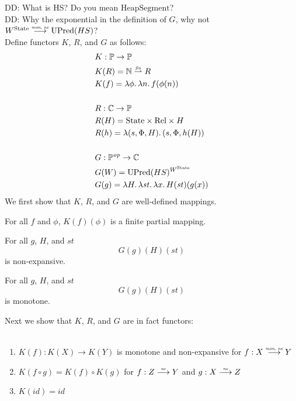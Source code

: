 \documentclass{article}
\newcommand{\forcenewline}{$\phantom{v}$\\}
\newcommand{\finparfun}{\stackrel{\textit{\tiny{fin}}}{\rightharpoonup}}
\newcommand{\monnefun}{\stackrel{\textit{\tiny{mon, ne}}}{\longrightarrow}}
\newcommand{\nefun}{\stackrel{\textit{\tiny{ne}}}{\longrightarrow}}
\newcommand{\id}{\var{id}}
\newcommand{\CatC}{\mathbb{C}}
\newcommand{\CatP}{\mathbb{P}}
\newcommand\dominique[1]{{\color{purple} \sf \footnotesize {DD: #1}}\\}
\newcommand{\var}[1]{\mathit{#1}}
\newcommand{\plaindom}[1]{\mathrm{#1}}
\newcommand{\HeapSegments}{\plaindom{HeapSegment}}
\newcommand{\nats}{\mathbb{N}}
\newcommand{\Rel}{\plaindom{Rel}}
\newcommand{\States}{\plaindom{State}}
\newcommand{\UPred}[1]{\plaindom{UPred}(#1)}
\begin{document}
\dominique{What is HS? Do you mean $\HeapSegments$?}
\dominique{Why the exponential in the definition of $G$, why not $W^{\States} \monnefun \UPred{HS}$?}
Define functors $K$, $R$, and $G$ as follows:
\begin{align*}
  & K : \CatP \rightarrow \CatP \\
  & K(R) = \nats \finparfun R \\
  & K(f) = \lambda \phi \ldotp \lambda n \ldotp f(\phi(n)) \\
  & \\
  & R : \CatC \rightarrow \CatP \\
  & R(H) = \States \times \Rel \times H\\
  & R(h) = \lambda (s,\Phi,H) \ldotp (s,\Phi,h(H))\\
  & \\
  & G : \CatP^{\var{op}} \rightarrow \CatC \\
  & G(W) = \UPred{HS}^{W^{\States}} \\
  & G(g) = \lambda H \ldotp \lambda \var{st} \ldotp \lambda x \ldotp H (\var{st})(g(x))
\end{align*}
We first show that $K$, $R$, and $G$ are well-defined mappings.
\begin{lemma}
  \label{lem:world-finpar}
  For all $f$ and $\phi$, $K(f)(\phi)$ is a finite partial mapping.
\end{lemma}
\begin{lemma}
\label{lem:HSP-mon}
For all $g$, $H$, and $\var{st}$
\[
G(g) (H) (\var{st})
\]
is non-expansive.
\end{lemma}
\begin{lemma}
\label{lem:HSP-ne}
For all $g$, $H$, and $\var{st}$
\[
G(g) (H) (\var{st})
\]
is monotone.
\end{lemma}
Next we show that $K$, $R$, and $G$ are in fact functors:
\begin{lemma}[$K$ functorial]\forcenewline
\label{lem:K-func}
  \begin{enumerate}
  \item $K(f) : K(X) \rightarrow K(Y)$ is monotone and non-expansive for $f : X \monnefun Y$
  \item $K(f \circ g) = K(f) \circ K(g)$ for $f : Z \nefun Y$ and $g : X \nefun Z$
  \item $K(\id) = \id$
  \end{enumerate}
\end{lemma}
\end{document}
